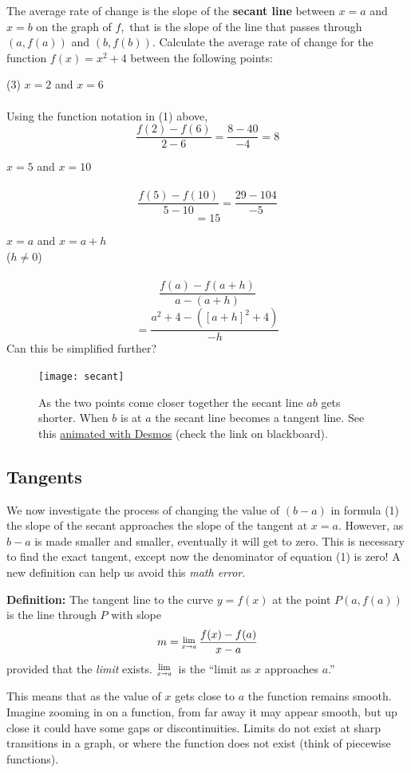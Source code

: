 The average rate of change is the slope of the \textbf{secant line} between $x =a$ and $x =b$ on the graph of $f$,\ that is the slope of the line that passes through $(a ,f (a))$ and $(b ,f (b))$.
\clearpage
\example Calculate the average rate of change for the function $f (x) =x^{2} +4$ between the following points:
\begin{tasks}(3)
\task $x =2$ and $x =6$ \\
\solution\\ Using the function notation in (1) above, \[\frac{f(2)-f(6)}{2-6}=\frac{8-40}{-4}=8\]

\task $x =5$ and $x =10$ \\
\solution\\
\[\frac{f(5)-f(10)}{5-10}=\frac{29-104}{-5}\]
\[=15\]

\task $x =a$ and $x =a +h$\\ ($h \neq 0$) \\
\solution\\
\[\frac{f(a)-f(a+h)}{a-(a+h)}\]
\[=\frac{a^2+4-([a+h]^2+4)}{-h}\]
Can this be simplified further?
\end{tasks}
\begin{figure}\begin{center}
\texttt{[image: secant]}
\caption{As the two points come closer together the secant line $ab$ gets shorter. When $b$ is at $a$ the secant line becomes a tangent line. See this \href{https://www.desmos.com/calculator/1zlwbppkuh}{animated with Desmos} (check the link on blackboard).}\end{center}
\end{figure}

\subsection*{Tangents}
We now investigate the process of changing the value of $(b -a)$ in formula (1) the slope of the secant approaches the slope of the tangent at $x =a$. However, as $b -a$ is made smaller and smaller, eventually it will get to zero. This is necessary to find the exact tangent, except now the denominator of equation (1) is zero! A new definition can help us avoid this \textit{math error}.
\begin{tcolorbox}
\textbf{Definition:} The tangent line to the curve $y =f (x)$ at the point $P (a ,f (a))$ is the line through $P$ with slope \[m =\Lim{x\to a}\frac{f (x) -f (a)}{x -a}\] provided that the \textit{limit} exists. $\Lim{x\to a}$ is the ``limit as $x$ approaches $a$.''
\end{tcolorbox}
This means that as the value of $x$ gets close to $a$ the function remains smooth. Imagine zooming in on a function, from far away it may appear smooth, but up close it could have some gaps or discontinuities.  Limits do not exist at sharp transitions in a graph, or where the function does not exist (think of piecewise functions).

